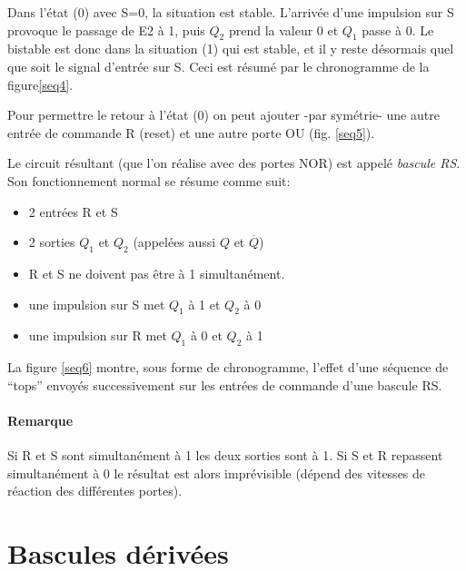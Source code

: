 Dans l'\'etat (0) avec S=0, la situation est stable.  L'arriv\'ee
d'une impulsion sur S provoque le passage de E2 \`a 1, puis $Q_2$
prend la valeur 0 et $Q_1$ passe \`a 0. Le bistable est donc dans la
situation (1) qui est stable, et il y reste d\'esormais quel que soit
le signal d'entr\'ee sur S. Ceci est r\'esum\'e par le chronogramme de
la figure\ref{seq4}.

%
%
%

Pour permettre le retour  \`a l'\'etat (0) on peut ajouter -par sym\'etrie-
une autre entr\'ee de commande R (reset) et une autre porte OU (fig.
\ref{seq5}).

Le circuit r\'esultant (que l'on r\'ealise avec des portes NOR) est
appel\'e {\em bascule RS}. Son fonctionnement normal se r\'esume comme suit:
\begin{itemize}
\item 2 entr\'ees R et S
\item 2 sorties $Q_1$ et $ Q_2$ (appel\'ees aussi $Q$ et $\overline{Q}$)
\item R et S ne doivent pas \^etre \`a 1 simultan\'ement.
\item une impulsion sur S met $Q_1$ \`a 1 et $Q_2$ \`a 0
\item une impulsion sur R met $Q_1$ \`a 0 et $Q_2$ \`a 1
\end{itemize}

La figure \ref{seq6} montre, sous forme de chronogramme, l'effet d'une
s\'equence de ``tops''  envoy\'es successivement sur les entr\'ees de commande
d'une bascule RS.


\paragraph{Remarque}
Si R et S sont simultan\'ement \`a 1 les deux sorties sont \`a 1. Si S et R
repassent simultan\'ement \`a 0 le r\'esultat est alors impr\'evisible 
(d\'epend des vitesses de r\'eaction des diff\'erentes portes).


\section{Bascules d\'eriv\'ees}

